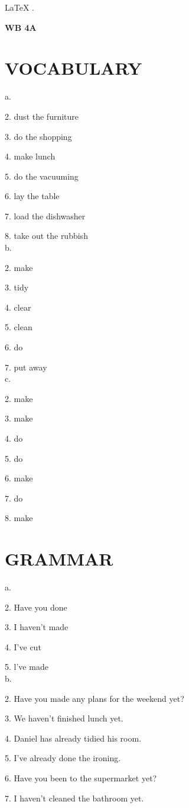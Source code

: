 \documentclass{article}
\begin{document}
\begin{center}
    \color{pink}
    \LARGE
    \LaTeX
    \color{lime}
    .
\end{center}

\textbf{WB 4A}
\section*{VOCABULARY}


a. 

2. dust the furniture

3. do the shopping

4. make lunch

5. do the vacuuming

6. lay the table

7. load the dishwasher

8. take out the rubbish
\\
b. 

2. make

3. tidy

4. clear

5. clean

6. do

7. put away
\\
c. 

2. make

3. make

4. do

5. do

6. make

7. do

8. make
\section*{GRAMMAR}

a. 

2. Have you done

3. I haven't made

4. I've cut

5. l've made
\\
b. 

2. Have you made any plans for the
weekend yet?

3. We haven't finished lunch yet.

4. Daniel has already tidied his room.

5. I've already done the ironing.

6. Have you been to the supermarket
yet?

7. I haven't cleaned the bathroom yet.
\end{document}
